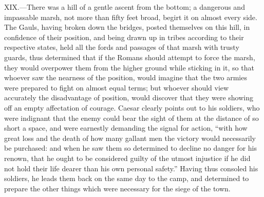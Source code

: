 XIX.—There was a hill of a gentle ascent from the bottom; a dangerous
and impassable marsh, not more than fifty feet broad, begirt it on
almost every side. The Gauls, having broken down the bridges, posted
themselves on this hill, in confidence of their position, and being
drawn up in tribes according to their respective states, held all the
fords and passages of that marsh with trusty guards, thus determined
that if the Romans should attempt to force the marsh, they would
overpower them from the higher ground while sticking in it, so that
whoever saw the nearness of the position, would imagine that the two
armies were prepared to fight on almost equal terms; but whoever should
view accurately the disadvantage of position, would discover that they
were showing off an empty affectation of courage. Caesar clearly points
out to his soldiers, who were indignant that the enemy could bear the
sight of them at the distance of so short a space, and were earnestly
demanding the signal for action, ``with how great loss and the death of
how many gallant men the victory would necessarily be purchased: and
when he saw them so determined to decline no danger for his renown, that
he ought to be considered guilty of the utmost injustice if he did not
hold their life dearer than his own personal safety.'' Having thus
consoled his soldiers, he leads them back on the same day to the camp,
and determined to prepare the other things which were necessary for the
siege of the town.


